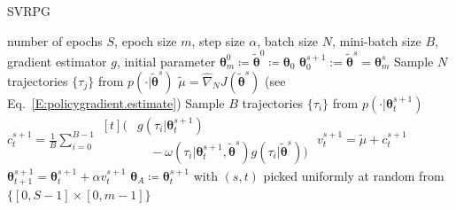 \documentclass{article}
\theoremstyle{remark}
\theoremstyle{definition}
\newcommand{\vtheta}{\boldsymbol{\theta}}
\newcommand{\Reward}{\mathcal{R}}
\newcommand{\score}[2]{\nabla\log p_{#1}(#2)}
\newcommand{\gradApp}[2]{\widehat{\nabla}_{#2}J(#1)}
\newcommand{\wt}[1]{\widetilde{#1}}
\begin{document}
\begin{algorithm}[tb]
	\caption{SVRPG}
	\label{alg:svrpg}
	\begin{algorithmic}
		 number of epochs $S$, epoch size $m$, step size $\alpha$, batch size $N$, mini-batch size $B$, gradient estimator $g$, initial parameter $\vtheta_{m}^0 \coloneqq \wt{\vtheta}^0 \coloneqq \vtheta_0$
		\STATE $\vtheta_0^{s+1} := \wt{\vtheta}^{s} = \vtheta_{m}^s$
		\STATE Sample $N$ trajectories $\{\tau_j\}$ from $p(\cdot\vert\wt{\vtheta}^{s})$
		\STATE $ \wt{\mu} = \gradApp{\wt{\vtheta}^{s}}{N}$ (see Eq.~\eqref{E:policygradient.estimate})%
		\STATE Sample $B$ trajectories $\{\tau_i\}$ from $p(\cdot\vert\vtheta_t^{s+1})$
		\STATE $c^{s+1}_t = \frac{1}{B} \sum\limits_{i=0}^{B-1}
		\begin{aligned}[t]
		\Big( & g(\tau_i|\vtheta_t^{s+1})\\ 
		& \quad{} - \omega(\tau_i|\vtheta^{s+1}_t, \wt{\vtheta}^s) g(\tau_i| \wt{\vtheta}^s) \Big)
		\end{aligned}$
		\STATE $v^{s+1}_t = \wt{\mu} + c^{s+1}_t$ %
		\STATE $\vtheta_{t+1}^{s+1} = \vtheta_t^{s+1} + \alpha v^{s+1}_t$
		\ENDFOR
		\ENDFOR
		 $\vtheta_A\coloneqq\vtheta_t^{s+1}$ with $(s,t)$ picked uniformly at random from $\{[0,S-1]\times[0,m-1]\}$
	\end{algorithmic}
\end{algorithm} 
\end{document}
